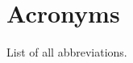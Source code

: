 \chapter{Acronyms}
\label{chp:acronyms}
\begin{info}
	List of all abbreviations.
\end{info}
\begin{sortedlist}


\end{sortedlist}
